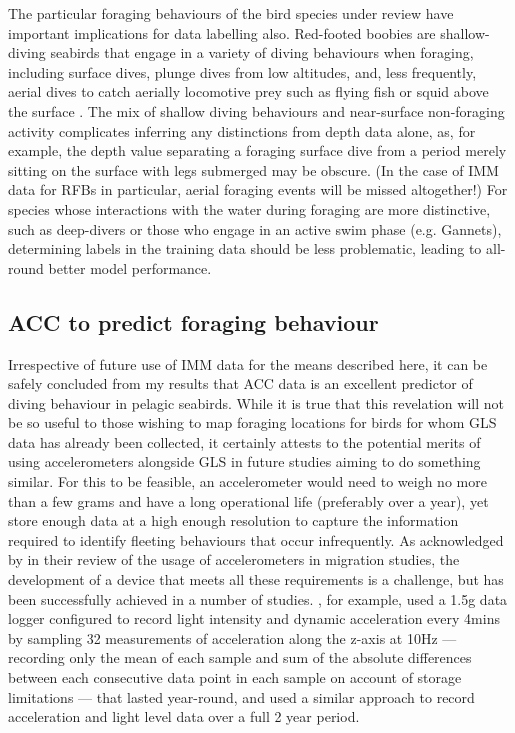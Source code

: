 \documentclass[11pt]{article}
\begin{document}
    The particular foraging behaviours of the bird species under review have important implications for data labelling also. Red-footed boobies are shallow-diving seabirds that engage in a variety of diving behaviours when foraging, including surface dives, plunge dives from low altitudes, and, less frequently, aerial dives to catch aerially locomotive prey such as flying fish or squid above the surface \citep{weimerskirch2005three,diamond1974red,pitman1993booby}. The mix of shallow diving behaviours and near-surface non-foraging activity complicates inferring any distinctions from depth data alone, as, for example, the depth value separating a foraging surface dive from a period merely sitting on the surface with legs submerged may be obscure. (In the case of IMM data for RFBs in particular, aerial foraging events will be missed altogether!) For species whose interactions with the water during foraging are more distinctive, such as deep-divers or those who engage in an active swim phase (e.g. Gannets), determining labels in the training data should be less problematic, leading to all-round better model performance. 
    
    \subsection{ACC to predict foraging behaviour}
    Irrespective of future use of IMM data for the means described here, it can be safely concluded from my results that ACC data is an excellent predictor of diving behaviour in pelagic seabirds. While it is true that this revelation will not be so useful to those wishing to map foraging locations for birds for whom GLS data has already been collected, it certainly attests to the potential merits of using accelerometers alongside GLS in future studies aiming to do something similar. For this to be feasible, an accelerometer would need to weigh no more than a few grams and have a long operational life (preferably over a year), yet store enough data at a high enough resolution to capture the information required to identify fleeting behaviours that occur infrequently.
    As acknowledged by \cite{backman2017actogram} in their review of the usage of accelerometers in migration studies, the development of a device that meets all these requirements is a challenge, but has been successfully achieved in a number of studies. \cite{liechti2013first}, for example, used a 1.5g data logger configured to record light intensity and dynamic acceleration every 4mins by sampling 32 measurements of acceleration along the z-axis at 10Hz — recording only the mean of each sample and sum of the absolute differences between each consecutive data point in each sample on account of storage limitations — that lasted year-round, and \cite{hedenstrom2016annual} used a similar approach to record acceleration and light level data over a full 2 year period.
    
\end{document}
